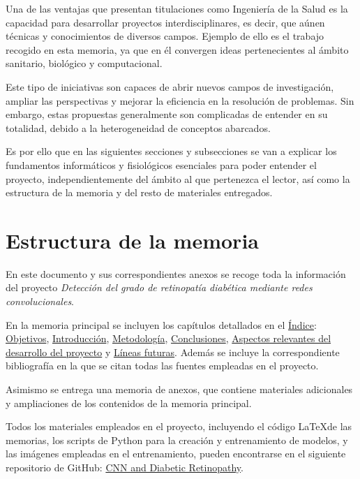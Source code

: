  \label{Intro}

\setlength{\parskip}{10pt}

Una de las ventajas que presentan titulaciones como Ingeniería de la Salud es la capacidad para desarrollar proyectos interdisciplinares, es decir, que aúnen técnicas y conocimientos de diversos campos. Ejemplo de ello es el trabajo recogido en esta memoria, ya que en él convergen ideas pertenecientes al ámbito sanitario, biológico y computacional.

Este tipo de iniciativas son capaces de abrir nuevos campos de investigación, ampliar las perspectivas y mejorar la eficiencia en la resolución de problemas. Sin embargo, estas propuestas generalmente son complicadas de entender en su totalidad, debido a la heterogeneidad de conceptos abarcados.

Es por ello que en las siguientes secciones y subsecciones se van a explicar los fundamentos informáticos y fisiológicos esenciales para poder entender el proyecto, independientemente del ámbito al que pertenezca el lector, así como la estructura de la memoria y del resto de materiales entregados.

\titlespacing{\section}{0pt}{0.25cm}{0.15cm}
\section{Estructura de la memoria}

En este documento y sus correspondientes anexos se recoge toda la información del proyecto \textit{Detección del grado de retinopatía diabética mediante redes convolucionales}.

En la memoria principal se incluyen los capítulos detallados en el \hyperref[toc]{Índice}: \hyperref[Obj]{Objetivos}, \hyperref[Intro]{Introducción}, \hyperref[Met]{Metodología}, \hyperref[Conc]{Conclusiones}, \hyperref[Aspe]{Aspectos relevantes del desarrollo del proyecto} y \hyperref[Fut]{Líneas futuras}. Además se incluye la correspondiente bibliografía en la que se citan todas las fuentes empleadas en el proyecto.

Asimismo se entrega una memoria de anexos, que contiene materiales adicionales y ampliaciones de los contenidos de la memoria principal.

Todos los materiales empleados en el proyecto, incluyendo el código \LaTeX de las memorias, los scripts de Python para la creación y entrenamiento de modelos, y las imágenes empleadas en el entrenamiento, pueden encontrarse en el siguiente repositorio de GitHub: \href{https://github.com/SamuelLozanoJuarez/CNN_and_Diabetic_Retinopathy}{CNN and Diabetic Retinopathy}.

